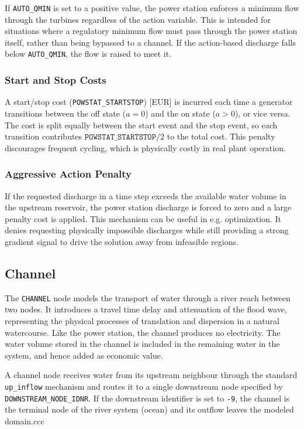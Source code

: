 \documentclass[a4paper, 12pt]{report}
\begin{document}
	If \texttt{AUTO\_QMIN} is set to a positive value, the power station enforces a minimum flow
	through the turbines regardless of the action variable. This is intended for situations where
	a regulatory minimum flow must pass through the power station itself, rather than being
	bypassed to a channel. If the action-based discharge falls below \texttt{AUTO\_QMIN}, the
	flow is raised to meet it.

	\subsubsection{Start and Stop Costs}

	A start/stop cost (\texttt{POWSTAT\_STARTSTOP}) [EUR] is incurred each time a generator
	transitions between the off state ($a = 0$) and the on state ($a > 0$), or vice versa. The
	cost is split equally between the start event and the stop event, so each transition
	contributes $\texttt{POWSTAT\_STARTSTOP} / 2$ to the total cost. This penalty discourages
	frequent cycling, which is physically costly in real plant operation.

	\subsubsection{Aggressive Action Penalty}

	If the requested discharge in a time step exceeds the available water volume in the upstream
	reservoir, the power station discharge is forced to zero and a large penalty cost is applied.
	This mechanism can be useful in e.g. optimization. It denies requesting physically impossible discharges while
	still providing a strong gradient signal to drive the solution away from infeasible regions.
	\newpage 

	\subsection{Channel}
	\label{subsec:channel}

	The \texttt{CHANNEL} node models the transport of water through a river reach between two
	nodes. It introduces a travel time delay and attenuation of the flood wave, representing the
	physical processes of translation and dispersion in a natural watercourse. Like the power
	station, the channel produces no electricity. The water volume stored in the channel is included in the remaining water in the system, and hence added as economic value.

	A channel node receives water from its upstream neighbour through the standard
	\texttt{up\_inflow} mechanism and routes it to a single downstream node specified by
	\texttt{DOWNSTREAM\_NODE\_IDNR}. If the downstream identifier is set to \texttt{-9}, the
	channel is the terminal node of the river system (ocean) and its outflow leaves the modeled domain.ccc
\end{document}
